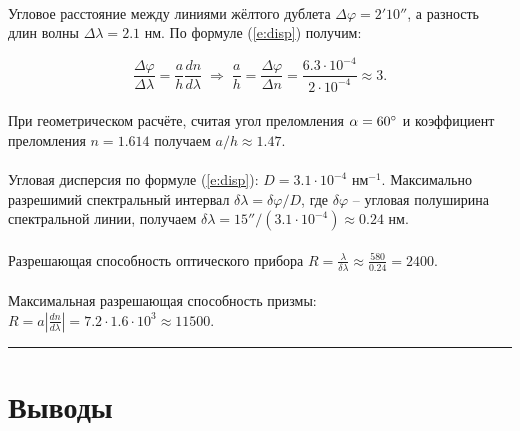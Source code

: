 \documentclass[a4paper,12pt]{article} %
\begin{document}
\paragraph{} Угловое расстояние между линиями жёлтого дублета $\Delta \varphi = 2'10''$, а разность длин волны $\Delta \lambda = 2.1$ нм. По формуле (\ref{e:disp}) получим:

\[
\frac{\Delta \varphi}{\Delta \lambda} = \frac{a}{h} \frac{dn}{d\lambda} \; \Rightarrow \; \frac{a}{h} = \frac{\Delta \varphi}{\Delta n} = \frac{6.3 \cdot 10^{-4}}{2 \cdot 10^{-4}} \approx 3.
\]

\paragraph{} При геометрическом расчёте, считая угол преломления $\alpha = 60 \degree$ и коэффициент преломления $n = 1.614$ получаем $a/h \approx 1.47$. 

\paragraph{} Угловая дисперсия по формуле (\ref{e:disp}): $D = 3.1 \cdot 10^{-4}$ нм$^{-1}$. Максимально разрешимий спектральный интервал $\delta \lambda = \delta \varphi / D$, где $\delta \varphi$ -- угловая полуширина спектральной линии, получаем $\delta \lambda = 15'' / (3.1 \cdot 10^{-4}) \approx 0.24$ нм. 

\paragraph{} Разрешающая способность оптического прибора $R = \frac{\lambda}{\delta \lambda} \approx \frac{580}{0.24} = 2400$.

\paragraph{} Максимальная разрешающая способность призмы: $R = a \left| \frac{dn}{d\lambda} \right| = 7.2 \cdot 1.6 \cdot 10^{3} \approx 11500$.

\medskip\hrule\medskip

\section{Выводы}
\end{document}
